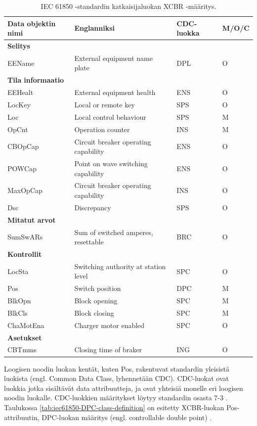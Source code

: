 \begin{table}[ht!]
	\caption{IEC 61850 -standardin katkaisijaluokan XCBR -määritys.}
	\label{tab:iec61850-xcbr-class-definition}
	\begin{tabular}{l | l | l | l}
		\hline
		\textbf{Data objektin nimi} & \textbf{Englanniksi} & \textbf{CDC-luokka} & \textbf{M/O/C} \\
		\hline \hline
		\multicolumn{4}{l}{\textbf{Selitys}} \\
		\hline
		EEName & External equipment name plate & DPL & O \\
		\hline
		\multicolumn{4}{l}{\textbf{Tila informaatio}} \\
		\hline
		EEHealt & External equipment health & ENS & O \\
		LocKey & Local or remote key & SPS & O \\
		Loc & Local control behaviour & SPS & M \\
		OpCnt & Operation counter & INS & M \\
		CBOpCap & Circuit breaker operating capability & ENS & O \\
		POWCap & Point on wave switching capability & ENS & O \\
		MaxOpCap & Circuit breaker operating capability & INS & O \\
		Dsc & Discrepancy & SPS & O \\
		\hline
		\multicolumn{4}{l}{\textbf{Mitatut arvot}} \\
		\hline
		SumSwARs & Sum of switched amperes, resettable & BRC & O \\
		\hline
		\multicolumn{4}{l}{\textbf{Kontrollit}} \\
		\hline
		LocSta & Switching authority at station level & SPC & O \\
		Pos & Switch position & DPC & M \\
		BlkOpn & Block opening & SPC & M \\
		BlkCls & Block closing & SPC & M \\
		ChaMotEna & Charger motor enabled & SPC & O \\
		\hline
		\multicolumn{4}{l}{\textbf{Asetukset}} \\
		\hline
		CBTmms & Closing time of braker & ING & O \\
		\hline
	\end{tabular}
\end{table}

Loogisen noodin luokan kentät, kuten Pos, rakentuvat standardin yleisistä luokista (engl. Common Data Class, lyhennetään CDC). CDC-luokat ovat luokkia jotka sisältävät data attribuutteja, ja ovat yhteisiä monelle eri loogisen noodin luokalle. CDC-luokkien määritykset löytyy standardin osasta 7-3 \cite[s.~26]{IEC61850-1}. Taulukossa \ref{tab:iec61850-DPC-class-definition} on esitetty XCBR-luokan Pos-attribuutin, DPC-luokan määritys (engl. controllable double point) \cite[s.~44]{IEC61850-7-3}.

